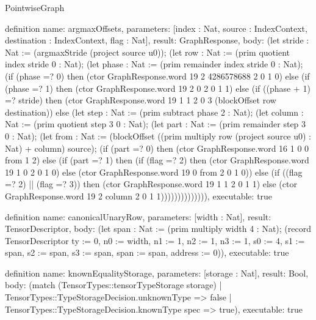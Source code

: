 \begin{lexlean}{PointwiseGraph}
\begin{semanticmodule}
definition{
  name: argmaxOffsets,
  parameters: [index : Nat, source : IndexContext, destination : IndexContext, flag : Nat],
  result: GraphResponse,
  body: (let stride : Nat := (argmaxStride (project source u0)); (let row : Nat := (prim quotient index stride 0 : Nat); (let phase : Nat := (prim remainder index stride 0 : Nat); (if (phase =? 0) then (ctor GraphResponse.word 19 2 4286578688 2 0 1 0) else (if (phase =? 1) then (ctor GraphResponse.word 19 2 0 2 0 1 1) else (if ((phase + 1) =? stride) then (ctor GraphResponse.word 19 1 1 2 0 3 (blockOffset row destination)) else (let step : Nat := (prim subtract phase 2 : Nat); (let column : Nat := (prim quotient step 3 0 : Nat); (let part : Nat := (prim remainder step 3 0 : Nat); (let from : Nat := (blockOffset ((prim multiply row (project source u0) : Nat) + column) source); (if (part =? 0) then (ctor GraphResponse.word 16 1 0 0 from 1 2) else (if (part =? 1) then (if (flag =? 2) then (ctor GraphResponse.word 19 1 0 2 0 1 0) else (ctor GraphResponse.word 19 0 from 2 0 1 0)) else (if ((flag =? 2) || (flag =? 3)) then (ctor GraphResponse.word 19 1 1 2 0 1 1) else (ctor GraphResponse.word 19 2 column 2 0 1 1)))))))))))))),
  executable: true
}

definition{
  name: canonicalUnaryRow,
  parameters: [width : Nat],
  result: TensorDescriptor,
  body: (let span : Nat := (prim multiply width 4 : Nat);
    (record TensorDescriptor {ty := 0, n0 := width, n1 := 1, n2 := 1, n3 := 1, s0 := 4, s1 := span, s2 := span, s3 := span, span := span, address := 0})),
  executable: true
}


definition{
  name: knownEqualityStorage,
  parameters: [storage : Nat],
  result: Bool,
  body: (match (TensorTypes::tensorTypeStorage storage)
    | TensorTypes::TypeStorageDecision.unknownType => false
    | TensorTypes::TypeStorageDecision.knownType spec => true),
  executable: true
}


\end{semanticmodule}
\end{lexlean}
